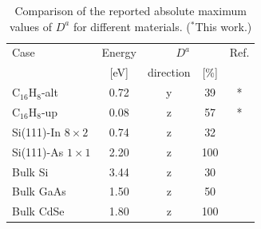 \documentclass[pss]{wiley2sp} %
\begin{document}
\begin{table}[b]
  \sidecaption
  \begin{tabular}{lcccc}
  \hline
  Case & Energy &  \multicolumn{2}{c}{$D^{a}$} &  Ref.\\
  \cline{3-4}
  & [eV]   & direction & [\%] \\
  \hline
  C$_{16}$H$_{8}$-alt  & 0.72 & y & 39  & * \\
  C$_{16}$H$_{8}$-up   & 0.08 & z & 57  & * \\
  Si(111)-In $8\times2$& 0.74 & z & 32  & \cite{arzatePRB14}  \\
  Si(111)-As $1\times1$& 2.20 & z & 100 & \cite{mendozaPRB12} \\
  Bulk Si              & 3.44 & z & 30  & \cite{nastosPRB07}     \\
  Bulk GaAs            & 1.50 & z & 50  & \cite{nastosPRB07,bhatPRB05} \\
  Bulk CdSe            & 1.80 & z & 100 & \cite{nastosPRB07}\\
  \hline
  \end{tabular}
  \caption[]{%
  Comparison of the reported absolute maximum values of {$D^{a}$} for different materials. ($^{*}$This work.)}
  \label{tab:dacomp}
\end{table}
\end{document}
